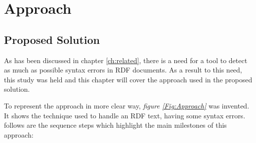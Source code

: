 \chapter{Approach}
\label{ch:approach}

\section{Proposed Solution}
As has been discussed in chapter \ref{ch:related}, there is a need for a tool to detect as much as possible syntax errors in RDF documents. As a result to this need, this study was held and this chapter will cover the approach used in the proposed solution.

	\vspace{5mm} %

 To represent the approach in more clear way, {\it figure \ref{Fig:Approach}} was invented. It shows the technique used to handle an RDF text, having some syntax errors. follows are the sequence steps which highlight the main milestones of this approach:
